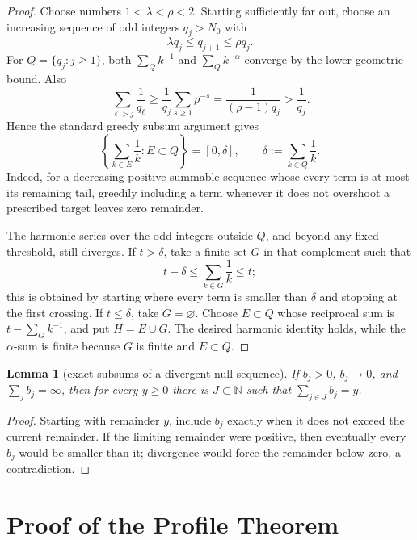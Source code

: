 \documentclass[11pt]{article}
\newtheorem{lemma}{Lemma}
\newcommand{\N}{\mathbb N}
\begin{document}
\begin{proof}
Choose numbers $1<\lambda<\rho<2$.  Starting sufficiently far out, choose
an increasing sequence of odd integers $q_j>N_0$ with
\[
  \lambda q_j\leq q_{j+1}\leq\rho q_j.
\]
For $Q=\{q_j:j\geq1\}$, both
\(\sum_{Q}k^{-1}\) and \(\sum_Q k^{-\alpha}\) converge by the lower
geometric bound.  Also
\[
 \sum_{\ell>j}\frac1{q_\ell}
 \geq \frac1{q_j}\sum_{s\geq1}\rho^{-s}
 =\frac1{(\rho-1)q_j}>\frac1{q_j}.
\]
Hence the standard greedy subsum argument gives
\[
 \left\{\sum_{k\in E}\frac1k:E\subset Q\right\}
 =\left[0,\delta\right],
 \qquad \delta:=\sum_{k\in Q}\frac1k.
\]
Indeed, for a decreasing positive summable sequence whose every term is at
most its remaining tail, greedily including a term whenever it does not
overshoot a prescribed target leaves zero remainder.

The harmonic series over the odd integers outside $Q$, and beyond any
fixed threshold, still diverges.  If $t>\delta$, take a finite set $G$ in
that complement such that
\[
  t-\delta\leq\sum_{k\in G}\frac1k\leq t;
\]
this is obtained by starting where every term is smaller than \(\delta\) and
stopping at the first crossing.  If $t\leq\delta$, take $G=\varnothing$.
Choose $E\subset Q$ whose reciprocal sum is
\(t-\sum_{G}k^{-1}\), and put $H=E\cup G$.  The desired harmonic identity
holds, while the \(\alpha\)-sum is finite because $G$ is finite and
\(E\subset Q\).
\end{proof}

\begin{lemma}[exact subsums of a divergent null sequence]\label{lem:greedy}
If $b_j>0$, $b_j\to0$, and \(\sum_j b_j=\infty\), then for every
\(y\geq0\) there is $J\subset\N$ such that \(\sum_{j\in J}b_j=y\).
\end{lemma}

\begin{proof}
Starting with remainder $y$, include $b_j$ exactly when it does not
exceed the current remainder.  If the limiting remainder were positive,
then eventually every $b_j$ would be smaller than it; divergence would
force the remainder below zero, a contradiction.
\end{proof}

\section*{Proof of the Profile Theorem}
\end{document}
